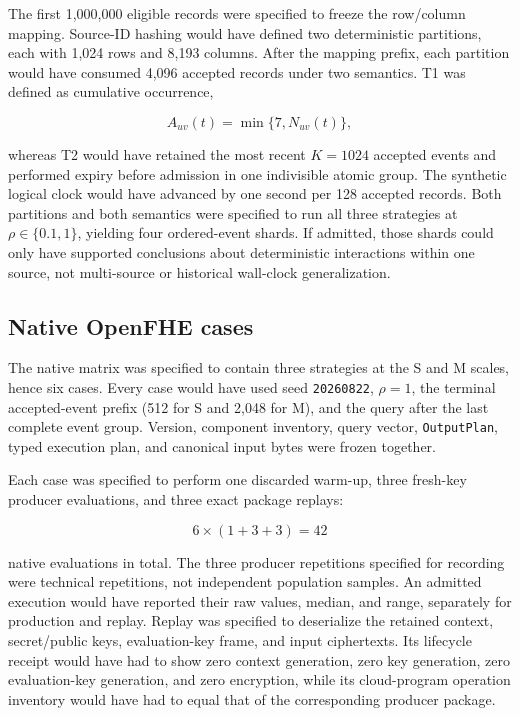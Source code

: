 The first 1,000,000 eligible records were specified to freeze the row/column mapping. Source-ID hashing would have defined two deterministic partitions, each with 1,024 rows and 8,193 columns. After the mapping prefix, each partition would have consumed 4,096 accepted records under two semantics. T1 was defined as cumulative occurrence,

\[
A_{uv}(t)=\min\{7,N_{uv}(t)\},
\]

whereas T2 would have retained the most recent \(K=1024\) accepted events and performed expiry before admission in one indivisible atomic group. The synthetic logical clock would have advanced by one second per 128 accepted records. Both partitions and both semantics were specified to run all three strategies at \(\rho\in\{0.1,1\}\), yielding four ordered-event shards. If admitted, those shards could only have supported conclusions about deterministic interactions within one source, not multi-source or historical wall-clock generalization.

\subsection{Native OpenFHE cases}\label{native-openfhe-cases}

The native matrix was specified to contain three strategies at the S and M scales, hence six cases. Every case would have used seed \texttt{20260822}, \(\rho=1\), the terminal accepted-event prefix (512 for S and 2,048 for M), and the query after the last complete event group. Version, component inventory, query vector, \texttt{OutputPlan}, typed execution plan, and canonical input bytes were frozen together.

Each case was specified to perform one discarded warm-up, three fresh-key producer evaluations, and three exact package replays:

\[
6\times(1+3+3)=42
\]

native evaluations in total. The three producer repetitions specified for recording were technical repetitions, not independent population samples. An admitted execution would have reported their raw values, median, and range, separately for production and replay. Replay was specified to deserialize the retained context, secret/public keys, evaluation-key frame, and input ciphertexts. Its lifecycle receipt would have had to show zero context generation, zero key generation, zero evaluation-key generation, and zero encryption, while its cloud-program operation inventory would have had to equal that of the corresponding producer package.

